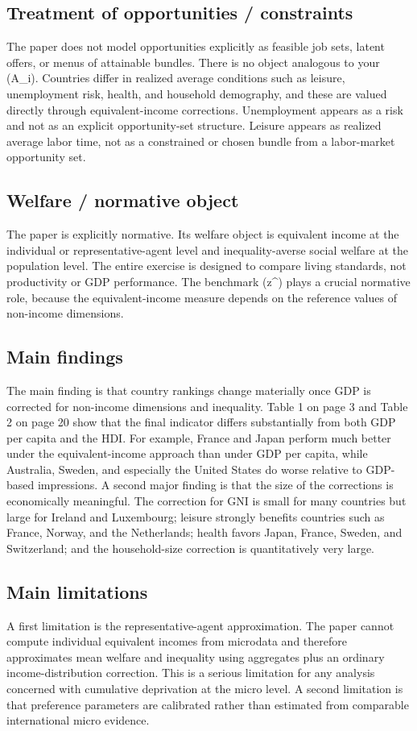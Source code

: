 \documentclass[11pt,a4paper]{article}
\begin{document}
\subsection*{Treatment of opportunities / constraints}
The paper does not model opportunities explicitly as feasible job sets, latent offers, or menus of attainable bundles. There is no object analogous to your (A\_i). Countries differ in realized average conditions such as leisure, unemployment risk, health, and household demography, and these are valued directly through equivalent-income corrections. Unemployment appears as a risk and not as an explicit opportunity-set structure. Leisure appears as realized average labor time, not as a constrained or chosen bundle from a labor-market opportunity set.

\subsection*{Welfare / normative object}
The paper is explicitly normative. Its welfare object is equivalent income at the individual or representative-agent level and inequality-averse social welfare at the population level. The entire exercise is designed to compare living standards, not productivity or GDP performance. The benchmark (z\textasciicircum{}) plays a crucial normative role, because the equivalent-income measure depends on the reference values of non-income dimensions.

\subsection*{Main findings}
The main finding is that country rankings change materially once GDP is corrected for non-income dimensions and inequality. Table 1 on page 3 and Table 2 on page 20 show that the final indicator differs substantially from both GDP per capita and the HDI. For example, France and Japan perform much better under the equivalent-income approach than under GDP per capita, while Australia, Sweden, and especially the United States do worse relative to GDP-based impressions. A second major finding is that the size of the corrections is economically meaningful. The correction for GNI is small for many countries but large for Ireland and Luxembourg; leisure strongly benefits countries such as France, Norway, and the Netherlands; health favors Japan, France, Sweden, and Switzerland; and the household-size correction is quantitatively very large.

\subsection*{Main limitations}
A first limitation is the representative-agent approximation. The paper cannot compute individual equivalent incomes from microdata and therefore approximates mean welfare and inequality using aggregates plus an ordinary income-distribution correction. This is a serious limitation for any analysis concerned with cumulative deprivation at the micro level. A second limitation is that preference parameters are calibrated rather than estimated from comparable international micro evidence.
\end{document}
